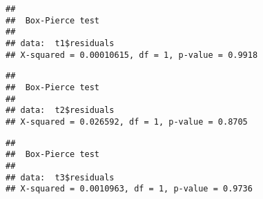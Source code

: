 \documentclass[
]{article}
\newenvironment{Shaded}{\begin{snugshade}}{\end{snugshade}}
\newcommand{\AttributeTok}[1]{\textcolor[rgb]{0.13,0.29,0.53}{#1}}
\newcommand{\FunctionTok}[1]{\textcolor[rgb]{0.13,0.29,0.53}{\textbf{#1}}}
\newcommand{\NormalTok}[1]{#1}
\newcommand{\SpecialCharTok}[1]{\textcolor[rgb]{0.81,0.36,0.00}{\textbf{#1}}}
\newcommand{\StringTok}[1]{\textcolor[rgb]{0.31,0.60,0.02}{#1}}
\begin{document}
\begin{Shaded}
\end{Shaded}

\begin{verbatim}
## 
##  Box-Pierce test
## 
## data:  t1$residuals
## X-squared = 0.00010615, df = 1, p-value = 0.9918
\end{verbatim}

\begin{Shaded}
\end{Shaded}

\begin{verbatim}
## 
##  Box-Pierce test
## 
## data:  t2$residuals
## X-squared = 0.026592, df = 1, p-value = 0.8705
\end{verbatim}

\begin{Shaded}
\end{Shaded}

\begin{verbatim}
## 
##  Box-Pierce test
## 
## data:  t3$residuals
## X-squared = 0.0010963, df = 1, p-value = 0.9736
\end{verbatim}
\end{document}
